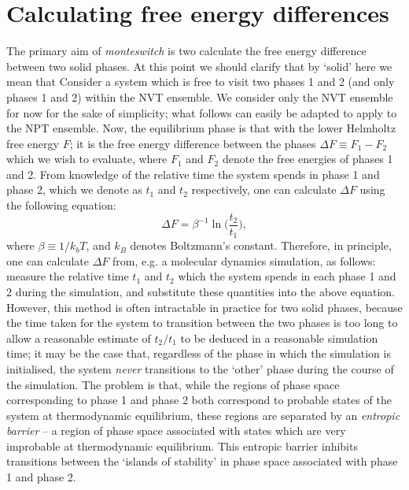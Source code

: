 \documentclass{report}
\begin{document}
\section{Calculating free energy differences}
The primary aim of \emph{monteswitch} is two calculate the free energy difference between two solid phases. At this point we should
clarify that by `solid' here we mean that 
Consider a system which is free to visit two phases 1 and 2 (and only phases 1 and 2) within the NVT ensemble. We consider only
the NVT ensemble for now for the sake of simplicity; what follows can easily be adapted to apply to the NPT ensemble.
Now, the equilibrium phase is that with the lower Helmholtz free energy $F$; it is the free energy difference between the phases $\Delta F\equiv F_1-F_2$ 
which we wish to evaluate, where $F_1$ and $F_2$ denote the free energies of phases 1 and 2. 
From knowledge of the relative time the system spends in phase 1 and phase 2, which we denote as $t_1$ and $t_2$ respectively, one can calculate $\Delta F$ 
using the following equation:
\begin{equation}\label{DeltaG_stat_mech}
\Delta F=\beta^{-1}\ln\biggl(\frac{t_2}{t_1}\biggr),
\end{equation}
where $\beta\equiv 1/k_bT$, and $k_B$ denotes Boltzmann's constant. Therefore, in principle, one can calculate $\Delta F$ from, e.g. a 
molecular dynamics simulation, as follows: measure the relative time $t_1$ and $t_2$ which the system spends in each phase 1 and 2 during the
simulation, and substitute these quantities into the above equation. However, this method is often intractable in practice for two solid phases, 
because the time taken for the system to transition between the two phases is too long to allow a reasonable estimate of $t_2/t_1$ to be deduced 
in a reasonable simulation time; it may be the case that, regardless of the phase in which the simulation is initialised, the system \emph{never} 
transitions to the `other' phase during the course of the simulation.
The problem is that, while the regions of phase space corresponding to phase 1 and phase 2 both correspond to probable states of the system
at thermodynamic equilibrium, these regions are separated by an \emph{entropic barrier} -- a region of phase space associated
with states which are very improbable at thermodynamic equilibrium. This entropic barrier inhibits transitions between the `islands of
stability' in phase space associated with phase 1 and phase 2.
\end{document}
